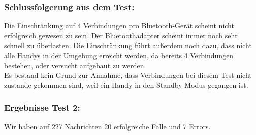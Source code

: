 \subsubsection{Schlussfolgerung aus dem
Test:}\label{schlussfolgerung-aus-dem-test-2}

Die Einschränkung auf 4 Verbindungen pro Bluetooth-Gerät scheint nicht
erfolgreich gewesen zu sein. Der Bluetoothadapter scheint immer noch
sehr schnell zu überlasten. Die Einschränkung führt außerdem noch dazu,
dass nicht alle Handys in der Umgebung erreicht werden, da bereits 4
Verbindungen bestehen, oder versucht aufgebaut zu werden.\\

Es bestand kein Grund zur Annahme, dass Verbindungen bei diesem Test
nicht zustande gekommen sind, weil ein Handy in den Standby Modus
gegangen ist.

\subsubsection{Ergebnisse Test 2:}\label{ergebnisse-test-2-1}

Wir haben auf 227 Nachrichten 20 erfolgreiche Fälle und 7 Errors.\\

